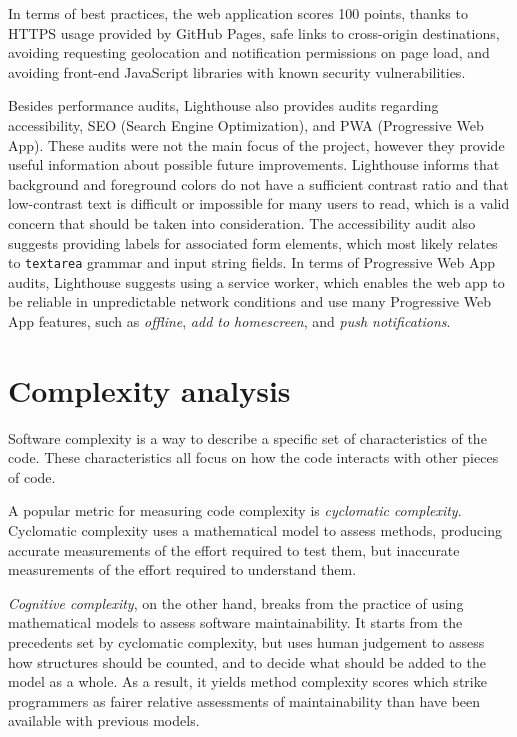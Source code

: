 \documentclass[english,engineering]{wizthesis}
\begin{document}
In terms of best practices, the web application scores 100 points, thanks to
HTTPS usage provided by GitHub Pages, safe links to cross-origin destinations,
avoiding requesting geolocation and notification permissions on page load,
and avoiding front-end JavaScript libraries with known security vulnerabilities.

Besides performance audits, Lighthouse also provides audits regarding
accessibility, SEO (Search Engine Optimization), and PWA (Progressive Web App).
These audits were not the main focus of the project, however they provide useful
information about possible future improvements. Lighthouse informs that
background and foreground colors do not have a sufficient contrast ratio and
that low-contrast text is difficult or impossible for many users to read, which
is a valid concern that should be taken into consideration. The accessibility
audit also suggests providing labels for associated form elements, which most
likely relates to \texttt{textarea} grammar and input string fields. In terms of
Progressive Web App audits, Lighthouse suggests using a service worker, which
enables the web app to be reliable in unpredictable network conditions and use
many Progressive Web App features, such as \emph{offline}, \emph{add to
homescreen}, and \emph{push notifications}.

\newpage

\section{Complexity analysis}

Software complexity is a way to describe a specific set of characteristics of
the code. These characteristics all focus on how the code interacts with other
pieces of code.

A popular metric for measuring code complexity is \emph{cyclomatic complexity}.
Cyclomatic complexity uses a mathematical model to assess methods, producing
accurate measurements of the effort required to test them, but inaccurate
measurements of the effort required to understand them.

\emph{Cognitive complexity}, on the other hand, breaks from the practice of
using mathematical models to assess software maintainability. It starts from the
precedents set by cyclomatic complexity, but uses human judgement to assess how
structures should be counted, and to decide what should be added to the model as
a whole. As a result, it yields method complexity scores which strike
programmers as fairer relative assessments of maintainability than have been
available with previous models.
\end{document}
